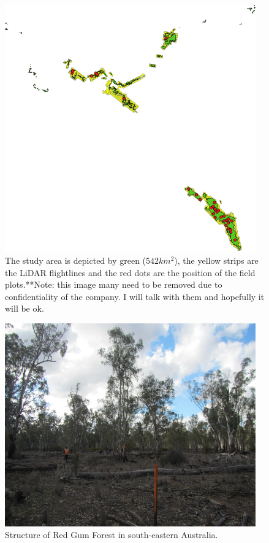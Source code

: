 \documentclass{subfiles}
\begin{document}
\begin{figure} [h!]
	\centering
	\begin{framed}
		\includegraphics[width=0.965\textwidth]{img/dead/StudyArea}
	\end{framed}
	\caption{The study area is depicted by green ($542km^2$), the yellow strips are the LiDAR flightlines and the red dots are the position of the field plots.{\color{red}**Note: this image many need to be removed due to confidentiality of the company. I will talk with them and hopefully it will be ok.}}
	\label{fig:StudyArea}
\end{figure}

\begin{figure} [h!]
	\centering
	\includegraphics[width=0.965\textwidth]{img/dead/Eucalyptus.png}
	\caption{Structure of Red Gum Forest in south-eastern Australia.}
	\label{fig:EucalyptusSize}
\end{figure}
\end{document}
